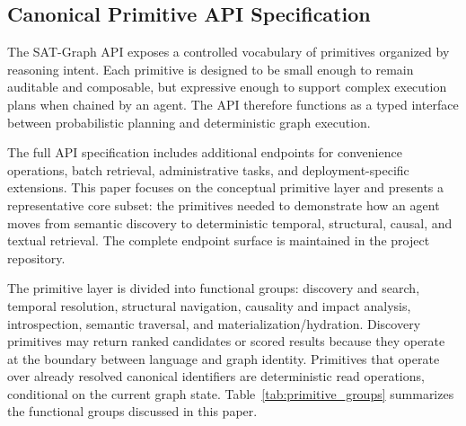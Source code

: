 \documentclass[11pt]{article}
\begin{document}
\subsection{Canonical Primitive API Specification}
\label{subsec:api_spec}

The SAT-Graph API exposes a controlled vocabulary of primitives organized by reasoning intent. Each primitive is designed to be small enough to remain auditable and composable, but expressive enough to support complex execution plans when chained by an agent. The API therefore functions as a typed interface between probabilistic planning and deterministic graph execution.

The full API specification includes additional endpoints for convenience operations, batch retrieval, administrative tasks, and deployment-specific extensions. This paper focuses on the conceptual primitive layer and presents a representative core subset: the primitives needed to demonstrate how an agent moves from semantic discovery to deterministic temporal, structural, causal, and textual retrieval. The complete endpoint surface is maintained in the project repository.

The primitive layer is divided into functional groups: discovery and search, temporal resolution, structural navigation, causality and impact analysis, introspection, semantic traversal, and materialization/hydration. Discovery primitives may return ranked candidates or scored results because they operate at the boundary between language and graph identity. Primitives that operate over already resolved canonical identifiers are deterministic read operations, conditional on the current graph state. Table~\ref{tab:primitive_groups} summarizes the functional groups discussed in this paper.
\end{document}
